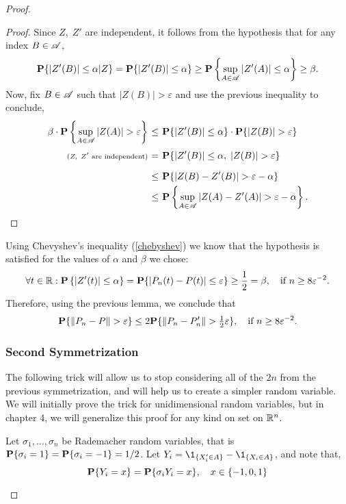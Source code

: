 \begin{proof}
  \begin{proof}
    Since $Z,\; Z'$ are independent, it follows from the hypothesis that for any index $B \in \AA$,
    \[ \P\{|Z'(B)|\leq \alpha | Z\} = \P\{|Z'(B)|\leq \alpha\} \geq \P \left\{ \sup_{A\in \AA}|Z'(A)|\leq \alpha \right\} \geq \beta.\] 
    Now, fix $B \in \AA$ such that $|Z(B)| > \varepsilon$ and use the previous inequality to conclude,
    \[\everymath{\displaystyle}\arraycolsep=1.8pt\def\arraystretch{1.8}
    \begin{array}{rcl}
      \beta \cdot \P\left\{\sup_{A\in \AA} |Z(A)| > \varepsilon \right\} & \leq & \P\{|Z'(B)| \leq \alpha\} \cdot \P\{|Z(B)| > \varepsilon\}\\
      {\text{\scriptsize ($Z,\; Z'$ are independent)}} & = & \P\{|Z'(B)| \leq \alpha,\; |Z(B)| > \varepsilon\}\\
       & \leq & \P\{ |Z(B) - Z'(B)| > \varepsilon - \alpha \}\\
        & \leq & \P\left\{\sup_{A\in \AA} |Z(A)-Z'(A)| > \varepsilon - \alpha \right\}.
    \end{array} \] 
  \end{proof}
  Using Chevyshev's inequality (\ref{chebyshev}) we know that the hypothesis is satisfied for the values of $\alpha$ and $\beta$ we chose:
  \[\forall t\in \R: \P\left\{ |Z'(t)| \leq \alpha \right\} = \P\{|P_n(t) - P(t)| \leq \varepsilon\} \geq \frac{1}{2} = \beta,\hspace*{1em} \text{if $n \geq 8\varepsilon^{-2}$}.\]
  Therefore, using the previous lemma, we conclude that
  \begin{equation}
    \label{gc:1} 
    \P\{\|P_n-P\| > \varepsilon\} \leq 2 \P\{\|P_n-P_n'\| > \tfrac{1}{2} \varepsilon\},\hspace*{1em} \text{if $n \geq 8\varepsilon^{-2}$}.
  \end{equation}

  \vspace*{1em}

  \subsubsection*{Second Symmetrization}
  The following trick will allow us to stop considering all of the $2n$ from the previous symmetrization, and will help us to create a simpler random variable. We will initially prove the trick for unidimensional random variables, but in chapter 4, we will generalize this proof for any kind on set on $\R^n$.

  \begin{lemma}\label{gc:l2}
    Let $\sigma_1, \ldots, \sigma_n$ be Rademacher random variables, that is $\P\{\sigma_i = 1\} = \P\{\sigma_i = -1\} = 1/2$. Let $Y_i = \1_{\{ X_i' \in A\}} - \1_{\{ X_i \in A\}}$, and note that,
    \[ \P\{Y_i = x\} = \P\{\sigma_i Y_i = x\},\hspace*{1em} x \in \{-1,0,1\} \] 
  \end{lemma}


\end{proof}
